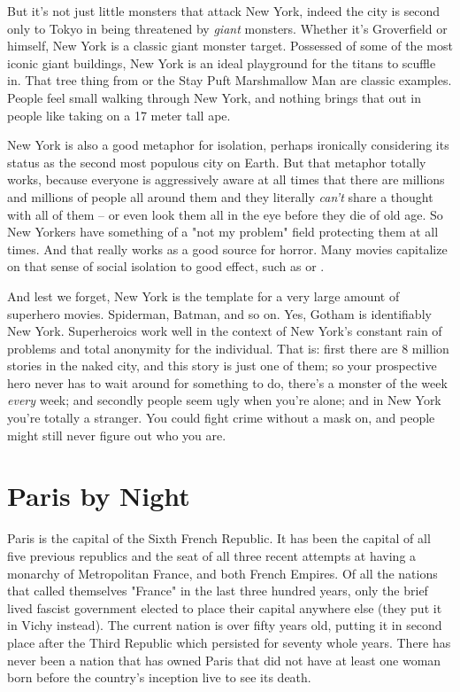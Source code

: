 But it's not just little monsters that attack New York, indeed the city is second only to Tokyo in being threatened by \textit{giant} monsters. Whether it's Groverfield or  himself, New York is a classic giant monster target. Possessed of some of the most iconic giant buildings, New York is an ideal playground for the titans to scuffle in. That tree thing from  or the Stay Puft Marshmallow Man are classic examples. People feel small walking through New York, and nothing brings that out in people like taking on a 17 meter tall ape.

New York is also a good metaphor for isolation, perhaps ironically considering its status as the second most populous city on Earth. But that metaphor totally works, because everyone is aggressively aware at all times that there are millions and millions of people all around them and they literally \textit{can't} share a thought with all of them -- or even look them all in the eye before they die of old age. So New Yorkers have something of a "not my problem" field protecting them at all times. And that really works as a good source for horror. Many movies capitalize on that sense of social isolation to good effect, such as  or .

And lest we forget, New York is the template for a very large amount of superhero movies. Spiderman, Batman, and so on. Yes, Gotham is identifiably New York. Superheroics work well in the context of New York's constant rain of problems and total anonymity for the individual. That is: first there are 8 million stories in the naked city, and this story is just one of them; so your prospective hero never has to wait around for something to do, there's a monster of the week \textit{every} week; and secondly people seem ugly when you're alone; and in New York you're totally a stranger. You could fight crime without a mask on, and people might still never figure out who you are.

\section{Paris by Night}

Paris is the capital of the Sixth French Republic. It has been the capital of all five previous republics and the seat of all three recent attempts at having a monarchy of Metropolitan France, and both French Empires. Of all the nations that called themselves "France" in the last three hundred years, only the brief lived fascist government elected to place their capital anywhere else (they put it in Vichy instead). The current nation is over fifty years old, putting it in second place after the Third Republic which persisted for seventy whole years. There has never been a nation that has owned Paris that did not have at least one woman born before the country's inception live to see its death.

